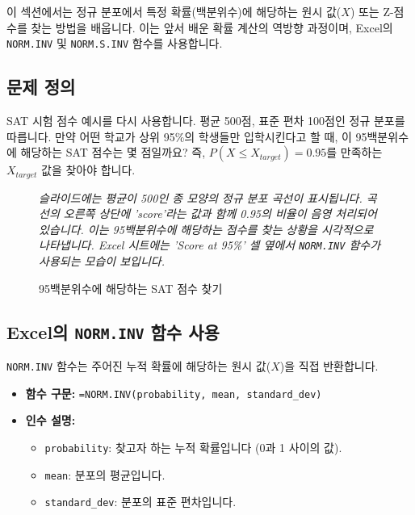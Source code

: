 \documentclass[11pt,a4paper]{article}
\begin{document}
이 섹션에서는 정규 분포에서 특정 확률(백분위수)에 해당하는 원시 값($X$) 또는 Z-점수를 찾는 방법을 배웁니다.
이는 앞서 배운 확률 계산의 역방향 과정이며, Excel의 \texttt{NORM.INV} 및 \texttt{NORM.S.INV} 함수를 사용합니다.

\subsection{문제 정의}
SAT 시험 점수 예시를 다시 사용합니다. 평균 500점, 표준 편차 100점인 정규 분포를 따릅니다.
만약 어떤 학교가 상위 95\%의 학생들만 입학시킨다고 할 때, 이 95백분위수에 해당하는 SAT 점수는 몇 점일까요?
즉, $P(X \le X_{target}) = 0.95$를 만족하는 $X_{target}$ 값을 찾아야 합니다.

\begin{figure}[h!]
    \centering
    \caption{95백분위수에 해당하는 SAT 점수 찾기}
    \label{fig:sat_inv_function}
    \vspace{0.5em}
    \textit{슬라이드에는 평균이 500인 종 모양의 정규 분포 곡선이 표시됩니다. 곡선의 오른쪽 상단에 'score'라는 값과 함께 0.95의 비율이 음영 처리되어 있습니다. 이는 95백분위수에 해당하는 점수를 찾는 상황을 시각적으로 나타냅니다. Excel 시트에는 'Score at 95\%' 셀 옆에서 \texttt{NORM.INV} 함수가 사용되는 모습이 보입니다.}
\end{figure}

\subsection{Excel의 \texttt{NORM.INV} 함수 사용}
\texttt{NORM.INV} 함수는 주어진 누적 확률에 해당하는 원시 값($X$)을 직접 반환합니다.

\begin{itemize}
    \item \textbf{함수 구문:} \texttt{=NORM.INV(probability, mean, standard\_dev)}
    \item \textbf{인수 설명:}
    \begin{itemize}
        \item \texttt{probability}: 찾고자 하는 누적 확률입니다 (0과 1 사이의 값).
        \item \texttt{mean}: 분포의 평균입니다.
        \item \texttt{standard\_dev}: 분포의 표준 편차입니다.
    \end{itemize}
\end{itemize}
\end{document}
